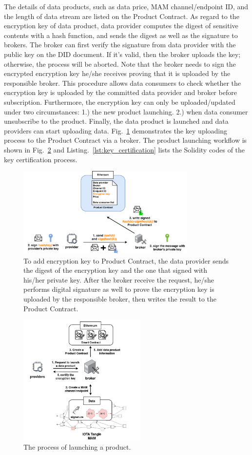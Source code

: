 \documentclass[conference]{IEEEtran}
\begin{document}
The details of data products, such as data price, MAM channel/endpoint ID, and the length of data stream are listed on the Product Contract. As regard to the encryption key of data product, data provider computes the digest of sensitive contents with a hash function, and sends the digest as well as the signature to brokers. The broker can first verify the signature from data provider with the public key on the DID document. If it's valid, then the broker uploads the key; otherwise, the process will be aborted. Note that the broker needs to sign the encrypted encryption key he/she receives proving that it is uploaded by the responsible broker. This procedure allows data consumers to check whether the encryption key is uploaded by the committed data provider and broker before subscription. Furthermore, the encryption key can only be uploaded/updated under two circumstances: 1.) the new product launching. 2.) when data consumer unsubscribe to the product. Finally, the data product is launched and data providers can start uploading data. Fig.~\ref{fig:key_upload} demonstrates the key uploading process to the Product Contract via a broker. The product launching workflow is shown in Fig.~\ref{fig:launching_product} and Listing.~\ref{lst:key_certification} lists the Solidity codes of the key certification process.

\begin{figure}[h]
    \centering
    \includegraphics[width=3.5in]{key_upload}
    \caption{To add encryption key to Product Contract, the data provider sends the digest of the encryption key and the one that signed with his/her private key. After the broker receive the request, he/she performs digital signature as well to prove the encryption key is uploaded by the responsible broker, then writes the result to the Product Contract.}
    \label{fig:key_upload}
\end{figure}

\begin{figure}[!t]
    \centering
    \includegraphics[width=2.5in]{launching_product}
    \caption{The process of launching a product.}
    \label{fig:launching_product}
\end{figure}
\end{document}
